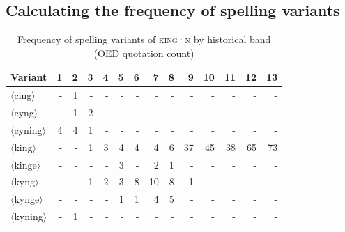 \documentclass[doc,biblatex]{apa7}
\newcommand\lemma[2]{\textsc{#1·#2}}
\newcommand\spelling[1]{\allowbreak$\langle$#1$\rangle$}
\begin{document}
\subsection{Calculating the frequency of spelling variants}

	\begin{table}
	\begin{center}
	\begin{threeparttable}
	\caption{Frequency of spelling variants of \lemma{king}{n} by historical band (OED quotation count)}
	\footnotesize
	\begin{tabular}{lrrrrrrrrrrrrr}
	\toprule
	Variant & 1 & 2 & 3 & 4 & 5 & 6 & 7 & 8 & 9 & 10 & 11 & 12 & 13 \\
	\midrule
	\spelling{cing}   & - & 1 & - & - & - & - &  - & - &  - &  - &  - &  - &  - \\
	\spelling{cyng}   & - & 1 & 2 & - & - & - &  - & - &  - &  - &  - &  - &  - \\
	\spelling{cyning} & 4 & 4 & 1 & - & - & - &  - & - &  - &  - &  - &  - &  - \\
	\spelling{king}   & - & - & 1 & 3 & 4 & 4 &  4 & 6 & 37 & 45 & 38 & 65 & 73 \\
	\spelling{kinge}  & - & - & - & - & 3 & - &  2 & 1 &  - &  - &  - &  - &  - \\
	\spelling{kyng}   & - & - & 1 & 2 & 3 & 8 & 10 & 8 &  1 &  - &  - &  - &  - \\
	\spelling{kynge}  & - & - & - & - & 1 & 1 &  4 & 5 &  - &  - &  - &  - &  - \\
	\spelling{kyning} & - & 1 & - & - & - & - &  - & - &  - &  - &  - &  - &  - \\
	\bottomrule
	\end{tabular}
	\label{king_oed_count}
	\end{threeparttable}
	\end{center}
	\end{table}
\end{document}
